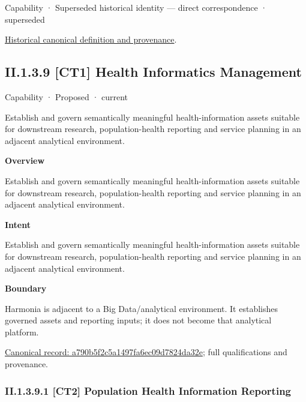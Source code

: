 \label{element:19263e0802cc4b88af7a345f1410cffd}
{\small Capability · Superseded historical identity — direct correspondence · superseded}\par
\href{../../../../continuum/strategy/capability/19263e0802cc4b88af7a345f1410cffd.md}{Historical canonical definition and provenance}.\par
\subsection*{II.1.3.9 [CT1] Health Informatics Management}
\label{navigation:II.1.3.9}

\label{element:a790b5f2c5a1497fa6ec09d7824da32e}
{\small Capability · Proposed · current}\par

Establish and govern semantically meaningful health-information assets suitable for downstream research, population-health reporting and service planning in an adjacent analytical environment.



\textbf{Overview}



Establish and govern semantically meaningful health-information assets suitable for downstream research, population-health reporting and service planning in an adjacent analytical environment.



\textbf{Intent}



Establish and govern semantically meaningful health-information assets suitable for downstream research, population-health reporting and service planning in an adjacent analytical environment.



\textbf{Boundary}



Harmonia is adjacent to a Big Data/analytical environment. It establishes governed assets and reporting inputs; it does not become that analytical platform.


{\footnotesize \href{../../../../continuum/strategy/capability/a790b5f2c5a1497fa6ec09d7824da32e.md}{Canonical record: a790b5f2c5a1497fa6ec09d7824da32e}; full qualifications and provenance.}\par
\subsubsection*{II.1.3.9.1 [CT2] Population Health Information Reporting}
\label{navigation:II.1.3.9.1}

